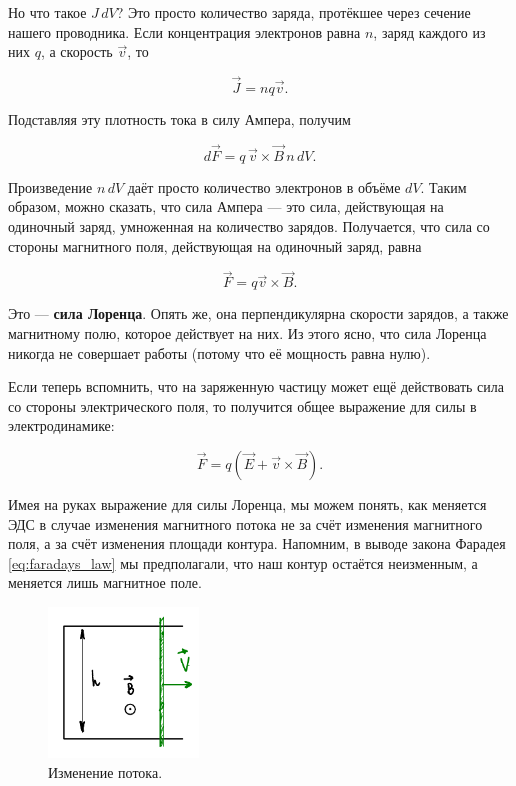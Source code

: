 \documentclass[11pt,a4paper]{article}
\numberwithin{equation}{section}
\begin{document}
Но что такое $J \, dV$? Это просто количество заряда, протёкшее через
сечение нашего проводника. Если концентрация электронов равна $n$, заряд
каждого из них $q$, а скорость $\vec{v}$, то 

\begin{equation}
  \label{eq:der_lorentz_force_2}
  \vec{J} = n q \vec{v}.
\end{equation}

Подставляя эту плотность тока в силу Ампера, получим

\begin{equation}
  \label{eq:der_lorentz_force_3}
  d\vec{F} = q \, \vec{v} \times \vec{B} \, n\, dV.
\end{equation}

Произведение $n \, dV$ даёт просто количество электронов в объёме
$dV$. Таким образом, можно сказать, что сила Ампера --- это сила,
действующая на одиночный заряд, умноженная на количество
зарядов. Получается, что сила со стороны магнитного поля, действующая
на одиночный заряд, равна

\begin{equation}
  \label{eq:lorentz_force}
  \vec{F} = q \vec{v} \times \vec{B}.
\end{equation}

Это --- \textbf{сила Лоренца}. Опять же, она перпендикулярна скорости
зарядов, а также магнитному полю, которое действует на них. Из этого
ясно, что сила Лоренца никогда не совершает работы (потому что её
мощность равна нулю). 

Если теперь вспомнить, что на заряженную частицу может ещё действовать
сила со стороны электрического поля, то получится общее выражение для
силы в электродинамике:

\begin{equation}
  \label{eq:force_electrodynamics}
  \vec{F} = q (\vec{E} + \vec{v} \times \vec{B}).
\end{equation}

Имея на руках выражение для силы Лоренца, мы можем понять, как
меняется ЭДС в случае изменения магнитного потока не за счёт изменения
магнитного поля, а за счёт изменения площади контура. Напомним, в
выводе закона Фарадея \eqref{eq:faradays_law} мы предполагали, что наш
контур остаётся неизменным, а меняется лишь магнитное поле. 

\begin{figure}
  \vspace{-1cm}
  \begin{center}
  \includegraphics[width=4cm]{faraday.pdf}  
  \end{center}
  \vspace{-1cm}
  \caption{Изменение потока.}
  \label{fig:faraday}
\end{figure}
\end{document}
